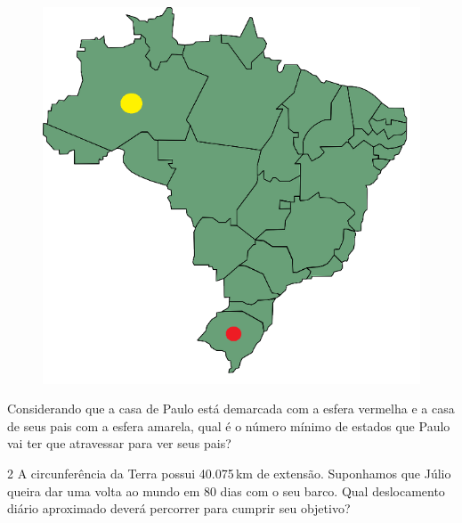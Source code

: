 \begin{figure}[H]
\centering\includegraphics[width=\textwidth]{./imgSAEB_8_MAT/media/image36.png}
\end{figure}


Considerando que a casa de Paulo está demarcada com a esfera vermelha e
a casa de seus pais com a esfera amarela, qual é o número mínimo de
estados que Paulo vai ter que atravessar para ver seus pais?


\num{2} A circunferência da Terra possui 40.075\,km de extensão. Suponhamos
que Júlio queira dar uma volta ao mundo em 80 dias com o seu barco. Qual
deslocamento diário aproximado deverá percorrer para cumprir seu
objetivo?





